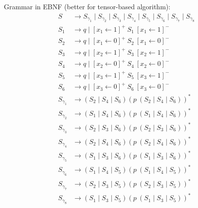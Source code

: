 Grammar in EBNF (better for tensor-based algorithm):
\begin{align*}
S & \to S_{\gamma_1} \mid S_{\gamma_2} \mid S_{\gamma_3} \mid S_{\gamma_4} \mid S_{\gamma_5} \mid S_{\gamma_6} \mid S_{\gamma_7} \mid S_{\gamma_8}\\
S_1 & \to q  
      \mid [x_1 \leftarrow 1]^+ \ S_1 \ [x_1 \leftarrow 1]^- \\ 
S_2 & \to q  
      \mid [x_1 \leftarrow 0]^+ \ S_2 \ [x_1 \leftarrow 0]^- \\ 
S_3 & \to q  
      \mid [x_2 \leftarrow 1]^+ \ S_3 \ [x_2 \leftarrow 1]^- \\ 
S_4 & \to q 
      \mid [x_2 \leftarrow 0]^+ \ S_4 \ [x_2 \leftarrow 0]^- \\ 
S_5 & \to q
      \mid [x_3 \leftarrow 1]^+ \ S_5 \ [x_3 \leftarrow 1]^- \\ 
S_6 & \to q
      \mid [x_3 \leftarrow 0]^+ \ S_6 \ [x_3 \leftarrow 0]^- \\ 
S_{\gamma_1} & \to (S_2 \mid S_4 \mid S_6) (p \ (S_2 \mid S_4 \mid S_6))^*\\
S_{\gamma_2} & \to (S_1 \mid S_4 \mid S_6) (p \ (S_1 \mid S_4 \mid S_6))^*\\
S_{\gamma_3} & \to (S_2 \mid S_3 \mid S_6) (p \ (S_2 \mid S_3 \mid S_6))^*\\
S_{\gamma_4} & \to (S_2 \mid S_4 \mid S_6) (p \ (S_2 \mid S_4 \mid S_6))^*\\
S_{\gamma_5} & \to (S_1 \mid S_3 \mid S_6) (p \ (S_1 \mid S_3 \mid S_6))^*\\
S_{\gamma_6} & \to (S_1 \mid S_4 \mid S_5) (p \ (S_1 \mid S_4 \mid S_5))^*\\
S_{\gamma_7} & \to (S_2 \mid S_3 \mid S_5) (p \ (S_2 \mid S_3 \mid S_5))^*\\
S_{\gamma_8} & \to (S_1 \mid S_3 \mid S_5) (p \ (S_1 \mid S_3 \mid S_5))^*\\
\end{align*}


